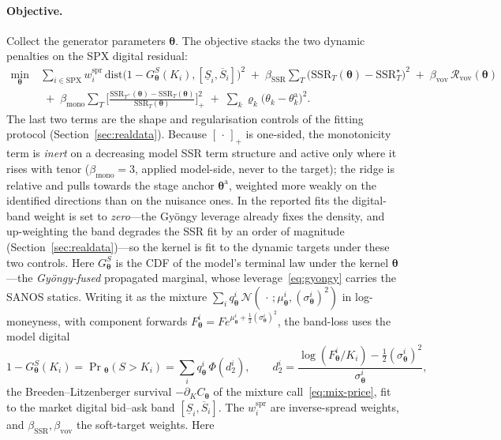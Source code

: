 \documentclass[11pt]{article}
\newcommand{\cN}{\mathcal{N}}
\newcommand{\cR}{\mathcal{R}}
\newcommand{\SSR}{\mathrm{SSR}}
\newcommand{\bth}{{\boldsymbol{\theta}}}
\begin{document}
\paragraph{Objective.}
Collect the generator parameters $\bth$. The objective stacks the two dynamic penalties on the SPX
digital residual:
\begin{equation}
\begin{aligned}
\min_\bth\ &\sum_{i\in\text{SPX}}w^{\mathrm{spr}}_i\,
\mathrm{dist}\big(1-G^S_\bth(K_i),[\underline S_i,\overline S_i]\big)^2
\;+\;\beta_{\SSR}\sum_T\big(\SSR_T(\bth)-\SSR^\star_T\big)^2
\;+\;\beta_{\mathrm{vov}}\,\cR_{\mathrm{vov}}(\bth)\\[2pt]
&\;+\;\beta_{\mathrm{mono}}\sum_T\Big[\frac{\SSR_{T^+}(\bth)-\SSR_T(\bth)}{\SSR_T(\bth)}\Big]_+^2
\;+\;\sum_k\varrho_k\big(\theta_k-\theta^{\mathrm a}_k\big)^2 .
\end{aligned}
\label{eq:objective}
\end{equation}
The last two terms are the shape and regularisation controls of the fitting protocol
(Section~\ref{sec:realdata}). Because $[\,\cdot\,]_+$ is one-sided, the monotonicity term is \emph{inert}
on a decreasing model SSR term structure and active only where it rises with tenor
($\beta_{\mathrm{mono}}{=}3$, applied model-side, never to the target); the ridge is relative and pulls
towards the stage anchor $\bth^{\mathrm a}$, weighted more weakly on the identified directions than on the
nuisance ones. In the reported fits the digital-band weight is set to \emph{zero}---the Gy\"ongy leverage
already fixes the density, and up-weighting the band degrades the SSR fit by an order of magnitude
(Section~\ref{sec:realdata})---so the kernel is fit to the dynamic targets under these two controls.
Here $G^S_\bth$ is the CDF of the model's terminal law under the kernel $\bth$---the
\emph{Gy\"ongy-fused} propagated marginal, whose leverage~\eqref{eq:gyongy} carries the SANOS
statics. Writing it as the mixture $\sum_i q^i_\bth\,\cN(\,\cdot\,;\mu^i_\bth,(\sigma^i_\bth)^2)$
in log-moneyness, with component forwards $F^i_\bth=Fe^{\mu^i_\bth+\frac12(\sigma^i_\bth)^2}$,
the band-loss uses the model digital
\[
1-G^S_\bth(K_i)=\Pr{}_\bth(S>K_i)=\sum_i q^i_\bth\,\Phi(d^i_2),\qquad
d^i_2=\frac{\log(F^i_\bth/K_i)-\tfrac12(\sigma^i_\bth)^2}{\sigma^i_\bth},
\]
the Breeden--Litzenberger survival $-\partial_K C_\bth$ of the mixture call~\eqref{eq:mix-price},
fit to the market digital bid--ask band $[\underline S_i,\overline S_i]$. The $w^{\mathrm{spr}}_i$ are
inverse-spread weights, and $\beta_{\SSR},\beta_{\mathrm{vov}}$ the soft-target weights. Here
\end{document}

